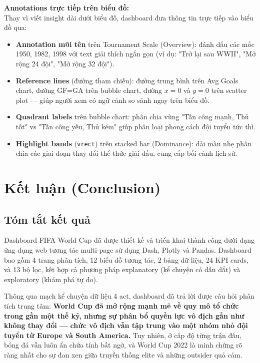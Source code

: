\documentclass[12pt,a4paper]{article}
\begin{document}
\textbf{Annotations trực tiếp trên biểu đồ:} \\
Thay vì viết insight dài dưới biểu đồ, dashboard đưa thông tin trực tiếp vào biểu đồ qua:
\begin{itemize}
    \item \textbf{Annotation mũi tên} trên Tournament Scale (Overview): đánh dấu các mốc 1950, 1982, 1998 với text giải thích ngắn gọn (ví dụ: "Trở lại sau WWII", "Mở rộng 24 đội", "Mở rộng 32 đội").
    \item \textbf{Reference lines} (đường tham chiếu): đường trung bình trên Avg Goals chart, đường GF=GA trên bubble chart, đường $x=0$ và $y=0$ trên scatter plot --- giúp người xem có ngữ cảnh so sánh ngay trên biểu đồ.
    \item \textbf{Quadrant labels} trên bubble chart: phân chia vùng "Tấn công mạnh, Thủ tốt" vs "Tấn công yếu, Thủ kém" giúp phân loại phong cách đội tuyển tức thì.
    \item \textbf{Highlight bands} (\texttt{vrect}) trên stacked bar (Dominance): dải màu nhẹ phân chia các giai đoạn thay đổi thể thức giải đấu, cung cấp bối cảnh lịch sử.
\end{itemize}


\newpage
\section{Kết luận (Conclusion)}

\subsection{Tóm tắt kết quả}
Dashboard FIFA World Cup đã được thiết kế và triển khai thành công dưới dạng ứng dụng web tương tác multi-page sử dụng Dash, Plotly và Pandas. Dashboard bao gồm 4 trang phân tích, 12 biểu đồ tương tác, 2 bảng dữ liệu, 24 KPI cards, và 13 bộ lọc, kết hợp cả phương pháp explanatory (kể chuyện có dẫn dắt) và exploratory (khám phá tự do).

Thông qua mạch kể chuyện dữ liệu 4 act, dashboard đã trả lời được câu hỏi phân tích trung tâm: \textbf{World Cup đã mở rộng mạnh mẽ về quy mô tổ chức trong gần một thế kỷ, nhưng sự phân bổ quyền lực vô địch gần như không thay đổi --- chức vô địch vẫn tập trung vào một nhóm nhỏ đội tuyển từ Europe và South America.} Tuy nhiên, ở cấp độ từng trận đấu, bóng đá vẫn luôn ẩn chứa tính bất ngờ, và World Cup 2022 là minh chứng rõ ràng nhất cho sự đan xen giữa truyền thống elite và những outsider quả cảm.
\end{document}
